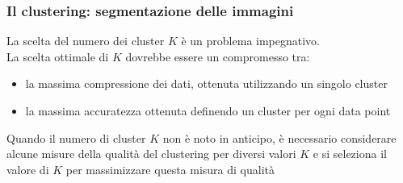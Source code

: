 {\begin{frame}
	\end{frame}
	
	\begin{frame}
	
		\frametitle{Il clustering: segmentazione delle immagini}
	
			La scelta del numero dei cluster $K$ è un problema impegnativo.\\
			La scelta ottimale di $K$ dovrebbe essere un compromesso tra:
			\begin{itemize}
				\item la massima compressione dei dati, ottenuta utilizzando un singolo cluster
				\item la massima accuratezza ottenuta definendo un cluster per ogni data point
			\end{itemize}
			Quando il numero di cluster $K$ non è noto in anticipo, è necessario considerare alcune misure della qualità del clustering per diversi valori $K$ e si seleziona il valore di $K$ per massimizzare questa misura di qualità
	
	\end{frame}
}

